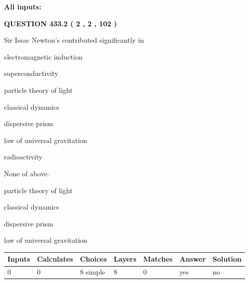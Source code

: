 \documentclass[12pt]{article}
\begin{document}
   
   
   
\noindent{}
   
   
   
   
\noindent\vspace{0.1in}\hspace{-0.08in} {\textbf{\Large{All inputs: }}}
   
   
  
\vspace{0.2in}
  
{\textbf{\Large{QUESTION
433.2 
 ( 2 , 2 , 102 )
}}}
  
  
Sir Issac Newton's contributed significantly in
 
 
electromagnetic induction
 
 
superconductivity
 
 
particle theory of light
 
 
classical dynamics
 
 
dispersive prism
 
 
law of universal gravitation
 
 
radioactivity
 
 
 None of above.
 
 
\noindent{}
 
 
particle theory of light
 
 
classical dynamics
 
 
dispersive prism
 
 
law of universal gravitation
 
 
\noindent{}
 
 
   
   
   
   
\noindent\begin{tabular}{|l|l|l|l|l|l|l|}
 \hline
Inputs & Calculates & Choices & Layers & Matches & Answer & Solution \\ \hline
 0  & 
 0  & 
 8
  simple  
  & 
 8  & 
 0  & 
  yes & 
  no 
  \\ \hline
 \end{tabular}
   
\end{document}

